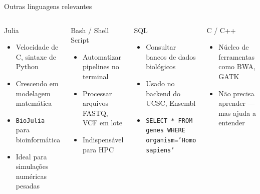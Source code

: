 \begin{frame}[fragile, shrink=15]{Outras linguagens relevantes}
\begin{columns}
\begin{block}{Julia}
\begin{itemize}
    \item Velocidade de C, sintaxe de Python
    \item Crescendo em modelagem matemática
    \item \texttt{BioJulia} para bioinformática
    \item Ideal para simulações numéricas pesadas
\end{itemize}
\end{block}

\vspace{0.2cm}
\begin{block}{Bash / Shell Script}
\begin{itemize}
    \item Automatizar pipelines no terminal
    \item Processar arquivos FASTQ, VCF em lote
    \item Indispensável para HPC
\end{itemize}
\end{block}

\begin{block}{SQL}
\begin{itemize}
    \item Consultar bancos de dados biológicos
    \item Usado no backend do UCSC, Ensembl
    \item \texttt{SELECT * FROM genes WHERE organism='Homo sapiens'}
\end{itemize}
\end{block}

\vspace{0.2cm}
\begin{block}{C / C++}
\begin{itemize}
    \item Núcleo de ferramentas como BWA, GATK
    \item Não precisa aprender — mas ajuda a entender
\end{itemize}
\end{block}
\end{columns}
\end{frame}


